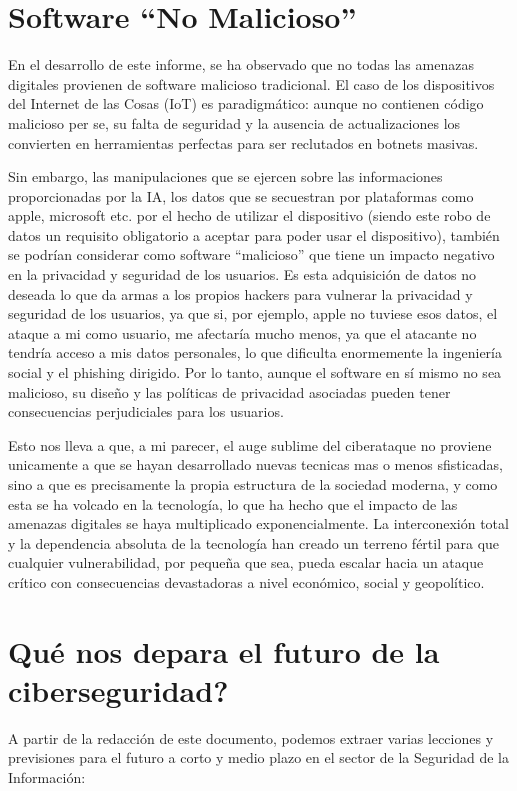 \section{Software ``No Malicioso''}
En el desarrollo de este informe, se ha observado que no todas las amenazas digitales provienen de software malicioso tradicional. El caso de los dispositivos del Internet de las Cosas (IoT) es paradigmático: aunque no contienen código malicioso per se, su falta de seguridad y la ausencia de actualizaciones los convierten en herramientas perfectas para ser reclutados en botnets masivas. 

Sin embargo, las manipulaciones que se ejercen sobre las informaciones proporcionadas por la IA, los datos que se secuestran por plataformas como apple, microsoft etc. por el hecho de utilizar el dispositivo (siendo este robo de datos un requisito obligatorio a aceptar para poder usar el dispositivo), también se podrían considerar como software ``malicioso'' que tiene un impacto negativo en la privacidad y seguridad de los usuarios.
Es esta adquisición de datos no deseada lo que da armas a los propios hackers para vulnerar la privacidad y seguridad de los usuarios, ya que si, por ejemplo, apple no tuviese esos datos, el ataque a mi como usuario, me afectaría mucho menos, ya que el atacante no tendría acceso a mis datos personales, lo que dificulta enormemente la ingeniería social y el phishing dirigido. Por lo tanto, aunque el software en sí mismo no sea malicioso, su diseño y las políticas de privacidad asociadas pueden tener consecuencias perjudiciales para los usuarios.

Esto nos lleva a que, a mi parecer, el auge sublime del ciberataque no proviene unicamente a que se hayan desarrollado nuevas tecnicas mas o menos sfisticadas, sino a que es precisamente la propia estructura de la sociedad moderna, y como esta se ha volcado en la tecnología, lo que ha hecho que el impacto de las amenazas digitales se haya multiplicado exponencialmente. La interconexión total y la dependencia absoluta de la tecnología han creado un terreno fértil para que cualquier vulnerabilidad, por pequeña que sea, pueda escalar hacia un ataque crítico con consecuencias devastadoras a nivel económico, social y geopolítico.

\section{\textquestiondown Qué nos depara el futuro de la ciberseguridad?}
A partir de la redacción de este documento, podemos extraer varias lecciones y previsiones para el futuro a corto y medio plazo en el sector de la Seguridad de la Información:

